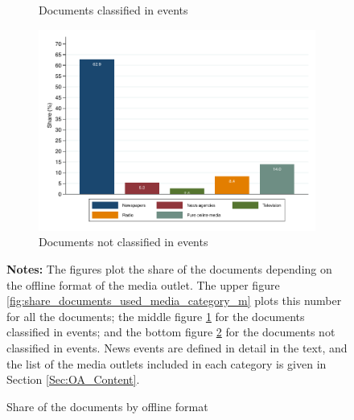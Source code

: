 \begin{figure}
\begin{center}
\begin{subfigure}{1\textwidth}
 	    \caption{Documents classified in events}
 	    \label{fig:share_documents_used_media_category_m_C}
\end{subfigure}
\begin{subfigure}{1\textwidth}
 	    \centering
 	    \includegraphics[scale=.6]{figures/share_documents_used_media_category_m_NC}
 	    \caption{Documents not classified in events}
 	    \label{fig:share_documents_used_media_category_m_NC}
\end{subfigure}
\end{center}
	\begin{spacing}{0.5}
		{\footnotesize \textbf{Notes:} The figures plot the share of the documents depending on the offline format of the media outlet. The upper figure \ref{fig:share_documents_used_media_category_m} plots this number for all the documents; the middle figure \ref{fig:share_documents_used_media_category_m_C} for the documents classified in events; and the bottom figure \ref{fig:share_documents_used_media_category_m_NC} for the documents not classified in events. News events are defined in detail in the text, and the list of the media outlets included in each category is given in Section \ref{Sec:OA_Content}.}
	\end{spacing}
\vspace{.5cm}	
	\caption{Share of the documents by offline format}
	\label{fig:share_documents_used_media_category}
\end{figure}





